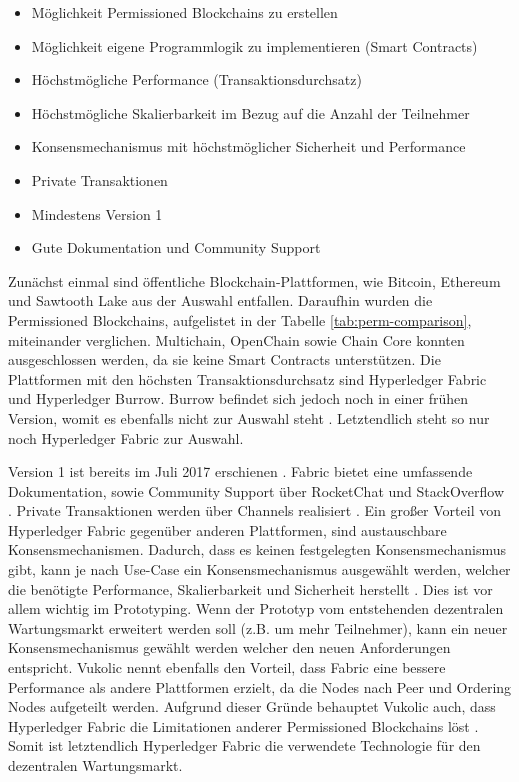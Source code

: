 \begin{itemize}
    \item Möglichkeit Permissioned Blockchains zu erstellen
    \item Möglichkeit eigene Programmlogik zu implementieren (Smart Contracts)
    \item Höchstmögliche Performance (Transaktionsdurchsatz)
    \item Höchstmögliche Skalierbarkeit im Bezug auf die Anzahl der Teilnehmer
    \item Konsensmechanismus mit höchstmöglicher Sicherheit und Performance
    \item Private Transaktionen   
    \item Mindestens Version 1
    \item Gute Dokumentation und Community Support
\end{itemize}

Zunächst einmal sind öffentliche Blockchain-Plattformen, wie Bitcoin, Ethereum und Sawtooth Lake aus der Auswahl entfallen. Daraufhin wurden die Permissioned Blockchains, aufgelistet in der Tabelle \ref{tab:perm-comparison}, miteinander verglichen. Multichain, OpenChain sowie Chain Core konnten ausgeschlossen werden, da sie keine Smart Contracts unterstützen. Die Plattformen mit den höchsten Transaktionsdurchsatz sind Hyperledger Fabric und Hyperledger Burrow. Burrow befindet sich jedoch noch in einer frühen Version, womit es ebenfalls nicht zur Auswahl steht \cite{HyperledgerFabricTeamHyperledgerFabricReleases2018}. Letztendlich steht so nur noch Hyperledger Fabric zur Auswahl. 

Version 1 ist bereits im Juli 2017 erschienen \cite{HyperledgerFabricTeamHyperledgerFabricReleases2018}. Fabric bietet eine umfassende Dokumentation, sowie Community Support über RocketChat und StackOverflow \cite{HyperledgerFabricTeamSupportHyperledgerFabric}. Private Transaktionen werden über Channels realisiert \cite{SchererPerformanceScalabilityBlockchain2017}. Ein großer Vorteil von Hyperledger Fabric gegenüber anderen Plattformen, sind austauschbare Konsensmechanismen. Dadurch, dass es keinen festgelegten Konsensmechanismus gibt, kann je nach Use-Case ein Konsensmechanismus ausgewählt werden, welcher die benötigte Performance, Skalierbarkeit und Sicherheit herstellt \cite{VukolicRethinkingPermissionedBlockchains2017}. Dies ist vor allem wichtig im Prototyping. Wenn der Prototyp vom entstehenden dezentralen Wartungsmarkt erweitert werden soll (z.B. um mehr Teilnehmer), kann ein neuer Konsensmechanismus gewählt werden welcher den neuen Anforderungen entspricht. Vukolic nennt ebenfalls den Vorteil, dass Fabric eine bessere Performance als andere Plattformen erzielt, da die Nodes nach Peer und Ordering Nodes aufgeteilt werden. Aufgrund dieser Gründe behauptet Vukolic auch, dass Hyperledger Fabric die Limitationen anderer Permissioned Blockchains löst \cite{VukolicRethinkingPermissionedBlockchains2017}. Somit ist letztendlich Hyperledger Fabric die verwendete Technologie für den dezentralen Wartungsmarkt.

